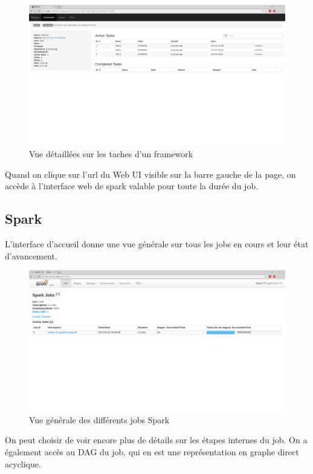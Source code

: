 \documentclass[a4paper, 11pt, titlepage]{article}
\begin{document}
\begin{figure}[H]
    \centering
    \centerline{\includegraphics[scale=0.23]{res/tasks.png}}
    \caption{Vue détaillées sur les taches d'un framework}
\end{figure}
Quand on clique sur l'url du Web UI visible sur la barre gauche de la page, on accède à l'interface web de spark valable pour toute la durée du job.
\newpage
\subsection{Spark}
L'interface d'accueil donne une vue générale sur tous les jobs en cours et leur état d'avancement.
\begin{figure}[H]
    \centering
    \centerline{\includegraphics[scale=0.23]{res/sphome.png}}
    \caption{Vue générale des différents jobs Spark}
\end{figure}
On peut choisir de voir encore plus de détails sur les étapes internes du job. On a également accès au DAG du job, qui en est une représentation en graphe direct acyclique.\\
\end{document}
